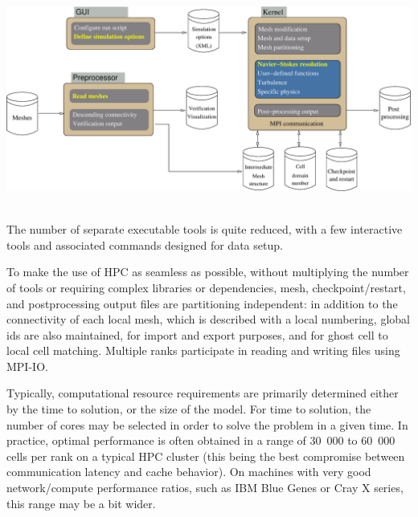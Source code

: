 ~\
\includegraphics[scale=0.2]{pictures/cs_components.eps}
\label{fig:cs_components}
\vspace{+0.04in}
~\

The number of separate executable tools is quite reduced, with a few
interactive tools and associated commands designed for data setup.

To make the use of HPC as seamless as possible, without multiplying the
number of tools or requiring complex libraries or dependencies,
mesh, checkpoint/restart, and postprocessing output files
are partitioning independent: in addition to the connectivity of each
local mesh, which is described with a local numbering, global ids are also
maintained, for import and export purposes, and for ghost cell to
local cell matching. Multiple ranks participate in reading and writing
files using MPI-IO.

Typically, computational resource requirements are primarily determined
either by the time to solution, or the size of the model. For time to
solution, the number of cores may be selected in order to solve the problem
in a given time. In practice, optimal performance is often obtained
in a range of 30~000 to 60~000 cells per rank on a typical HPC cluster
(this being the best compromise between communication latency and
cache behavior). On machines with very good network/compute performance
ratios, such as IBM Blue Genes or Cray X series, this range may be
a bit wider.
